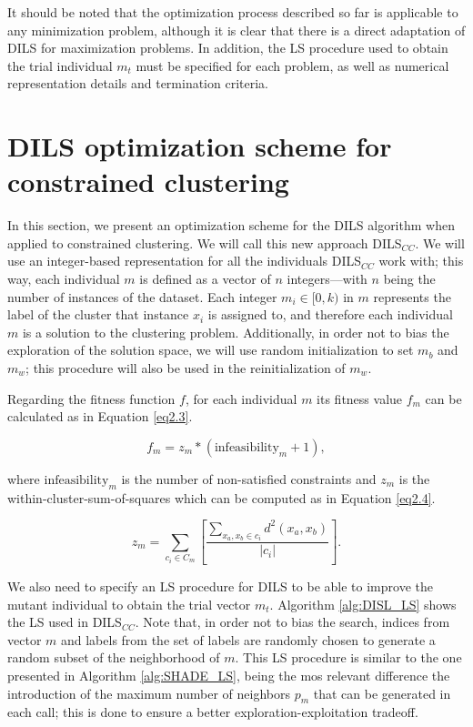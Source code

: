 It should be noted that the optimization process described so far is applicable to any minimization problem, although it is clear that there is a direct adaptation of \acs{DILS} for maximization problems. In addition, the \acs{LS} procedure used to obtain the trial individual $m_t$ must be specified for each problem, as well as numerical representation details and termination criteria.

\section{DILS optimization scheme for constrained clustering} \label{sec:DILS_CC}

In this section, we present an optimization scheme for the \acs{DILS} algorithm when applied to constrained clustering. We will call this new approach \acs{DILS}$_{CC}$. We will use an integer-based representation for all the individuals \acs{DILS}$_{CC}$ work with; this way, each individual $m$ is defined as a vector of $n$ integers---with $n$ being the number of instances of the dataset. Each integer $m_i \in [0,k)$ in $m$ represents the label of the cluster that instance $x_i$ is assigned to, and therefore each individual $m$ is a solution to the clustering problem. Additionally, in order not to bias the exploration of the solution space, we will use random initialization to set $m_b$ and $m_w$; this procedure will also be used in the reinitialization of $m_w$.

Regarding the fitness function $f$, for each individual $m$ its fitness value $f_m$ can be calculated as in Equation \ref{eq2.3}.

\begin{equation}
f_m = z_m * (\text{infeasibility}_m + 1),
\label{eq2.3}
\end{equation}

\noindent where $\text{infeasibility}_m$ is the number of non-satisfied constraints and $z_m$ is the within-cluster-sum-of-squares which can be computed as in Equation \eqref{eq2.4}.

\begin{equation}
z_m = \sum_{c_i \in C_m} \left[ \frac{\sum_{x_a, x_b \in c_i} d^2(x_a,x_b)}{|c_i|}\right].
\label{eq2.4}
\end{equation}

We also need to specify an \acs{LS} procedure for \acs{DILS} to be able to improve the mutant individual to obtain the trial vector $m_t$. Algorithm \ref{alg:DISL_LS} shows the \acs{LS} used in \acs{DILS}$_{CC}$. Note that, in order not to bias the search, indices from vector $m$ and labels from the set of labels are randomly chosen to generate a random subset of the neighborhood of $m$. This \acs{LS} procedure is similar to the one presented in Algorithm \ref{alg:SHADE_LS}, being the mos relevant difference the introduction of the maximum number of neighbors $p_m$ that can be generated in each call; this is done to ensure a better exploration-exploitation tradeoff. 


